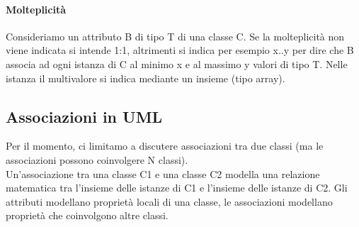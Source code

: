 \paragraph*{Molteplicità} Consideriamo un attributo B di tipo T di una classe C.
Se la molteplicità non viene indicata si intende 1:1, altrimenti si indica per
esempio x..y per dire che B associa ad ogni istanza di C al minimo x e al massimo y valori
di tipo T. Nelle istanza il multivalore si indica mediante un insieme (tipo array).
\subsection{Associazioni in UML}
Per il momento, ci limitamo a discutere associazioni tra due classi (ma le associazioni
possono coinvolgere N classi).
\\ Un'associazione tra una classe C1 e una classe C2 modella una relazione matematica
tra l'insieme delle istanze di C1 e l'insieme delle istanze di C2.
Gli attributi modellano proprietà locali di una classe, le associazioni modellano
proprietà che coinvolgono altre classi.


